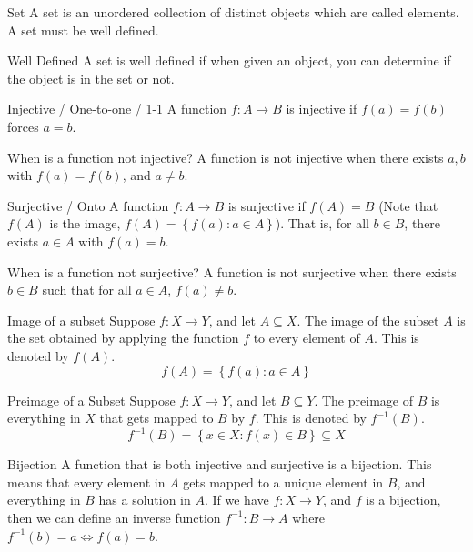\documentclass[12pt]{article}
\begin{document}
\begin{definition}{Set}{}
    A set is an unordered collection of distinct objects which are called elements. A set must be well defined.
\end{definition}
\begin{definition}{Well Defined}{}
    A set is well defined if when given an object, you can determine if the object is in the set or not.
\end{definition}
\begin{definition}{Injective / One-to-one / 1-1}{}
    A function $ f : A \to B $ is injective if $ f(a) = f(b) $ forces $ a = b $.
\end{definition}
\begin{remark}{When is a function not injective?}{}
    A function is not injective when there exists $ a, b $ with $ f(a) = f(b) $, and $ a \neq b $.
\end{remark}
\begin{definition}{Surjective / Onto}{}
    A function $ f : A \to B $ is surjective if $ f(A) = B $ (Note that $ f(A) $ is the image, $ f(A) = \left\{ f(a) : a \in A \right\} $). That is, for all $ b \in B $, there exists $ a \in A $ with $ f(a) = b $.
\end{definition}
\begin{remark}{When is a function not surjective?}{}
    A function is not surjective when there exists $ b \in B $ such that for all $ a \in A $, $ f(a) \neq b $.
\end{remark}
\begin{definition}{Image of a subset}{}
    Suppose $ f : X \to Y $, and let $ A \subseteq X $. The image of the subset $ A $ is the set obtained by applying the function $ f $ to every element of $ A $. This is denoted by $ f(A) $.
    \[ f(A) = \left\{ f(a) : a \in A \right\} \]
\end{definition}
\begin{definition}{Preimage of a Subset}{}
    Suppose $ f : X \to Y $, and let $ B \subseteq Y $. The preimage of $ B $ is everything in $ X $ that gets mapped to $ B $ by $ f $. This is denoted by $ f^{-1}(B) $.
    \[ f^{-1}(B) = \left\{ x \in X : f(x) \in B \right\} \subseteq X \]
\end{definition}
\begin{definition}{Bijection}{}
    A function that is both injective and surjective is a bijection. This means that every element in $ A $ gets mapped to a unique element in $ B $, and everything in $ B $ has a solution in $ A $. If we have $ f : X \to Y $, and $ f $ is a bijection, then we can define an inverse function $ f^{-1} : B \to A $ where $ f^{-1} (b) = a \Leftrightarrow f(a) = b $.
\end{definition}
\end{document}
